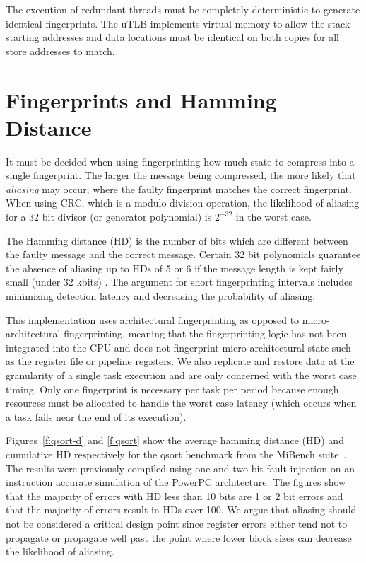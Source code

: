 	The execution of redundant threads must be completely deterministic to generate identical fingerprints. 
	The uTLB implements virtual memory to allow the stack starting addresses and data locations must be identical on both copies for all store addresses to match.

\section{Fingerprints and Hamming Distance}

	It must be decided when using fingerprinting how much state to compress into a single fingerprint. The larger the message being compressed, the more likely that \emph{aliasing} may occur, where the faulty fingerprint matches the correct fingerprint. 
	When using CRC, which is a modulo division operation, the likelihood of aliasing for a 32 bit divisor (or generator polynomial) is $2^{-32}$ in the worst case.
	
	The Hamming distance (HD) is the number of bits which are different between the faulty message and the correct message. 
	Certain 32 bit polynomials guarantee the absence of aliasing up to HDs of 5 or 6 if the message length is kept fairly small (under 32 kbits) \cite{koopman200232}.
	The argument for short fingerprinting intervals includes minimizing detection latency and decreasing the probability of aliasing.

	This implementation uses architectural fingerprinting as opposed to micro-architectural fingerprinting, meaning that the fingerprinting logic has not been integrated into the CPU and does not fingerprint micro-architectural state such as the register file or pipeline registers.
	We also replicate and restore data at the granularity of a single task execution and are only concerned with the worst case timing.
	Only one fingerprint is necessary per task per period because enough resources must be allocated to handle the worst case latency (which occurs when a task fails near the end of its execution). 
		
	Figures~\ref{f:qsort-d} and \ref{f:qsort} show the average hamming distance (HD) and cumulative HD respectively for the qsort benchmark from the MiBench suite~\cite{guthaus2001mibench}. 
	The results were previously compiled using one and two bit fault injection on an instruction accurate simulation of the PowerPC architecture. 
	The figures show that the majority of errors with HD less than 10 bits are 1 or 2 bit errors and that the majority of errors result in HDs over 100. 
	We argue that aliasing should not be considered a critical design point since register errors either tend not to propagate or propagate well past the point where lower block sizes can decrease the likelihood of aliasing.
	
